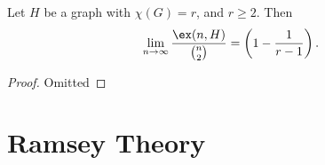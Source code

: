 \documentclass[a4paper]{scrartcl}
\begin{document}
\begin{theorem}
	Let $H$ be a graph with $\chi(G) = r$, and $r \geq 2$. Then
	$$
	\lim_{n \to \infty} \frac{\ex(n, H)}{\binom{n}{2}} = \left(1 - \frac{1}{r - 1}\right).
	$$
\end{theorem}
\begin{proof}[Proof]
	Omitted\let\qed\relax
\end{proof}

\section{Ramsey Theory}
\end{document}
